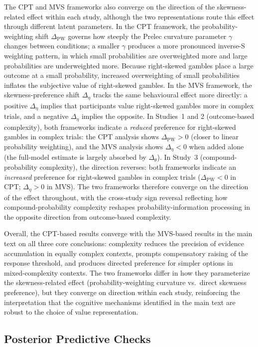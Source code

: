 \documentclass[man,floatsintext]{apa7}
\begin{document}
The CPT and MVS frameworks also converge on the direction of the skewness-related effect within each study, although the two representations route this effect through different latent parameters. In the CPT framework, the probability-weighting shift $\Delta_{\text{PW}}$ governs how steeply the Prelec curvature parameter $\gamma$ changes between conditions; a smaller $\gamma$ produces a more pronounced inverse-S weighting pattern, in which small probabilities are overweighted more and large probabilities are underweighted more. Because right-skewed gambles place a large outcome at a small probability, increased overweighting of small probabilities inflates the subjective value of right-skewed gambles. In the MVS framework, the skewness-preference shift $\Delta_\eta$ tracks the same behavioural effect more directly: a positive $\Delta_\eta$ implies that participants value right-skewed gambles more in complex trials, and a negative $\Delta_\eta$ implies the opposite. In Studies~1 and 2 (outcome-based complexity), both frameworks indicate a \emph{reduced} preference for right-skewed gambles in complex trials: the CPT analysis shows $\Delta_{\text{PW}} > 0$ (closer to linear probability weighting), and the MVS analysis shows $\Delta_\eta < 0$ when added alone (the full-model estimate is largely absorbed by $\Delta_\theta$). In Study~3 (compound-probability complexity), the direction reverses: both frameworks indicate an \emph{increased} preference for right-skewed gambles in complex trials ($\Delta_{\text{PW}} < 0$ in CPT; $\Delta_\eta > 0$ in MVS). The two frameworks therefore converge on the direction of the effect throughout, with the cross-study sign reversal reflecting how compound-probability complexity reshapes probability-information processing in the opposite direction from outcome-based complexity.

Overall, the CPT-based results converge with the MVS-based results in the main text on all three core conclusions: complexity reduces the precision of evidence accumulation in equally complex contexts, prompts compensatory raising of the response threshold, and produces directed preference for simpler options in mixed-complexity contexts. The two frameworks differ in how they parameterize the skewness-related effect (probability-weighting curvature vs.\ direct skewness preference), but they converge on direction within each study, reinforcing the interpretation that the cognitive mechanisms identified in the main text are robust to the choice of value representation.

\subsection{Posterior Predictive Checks}
\end{document}
